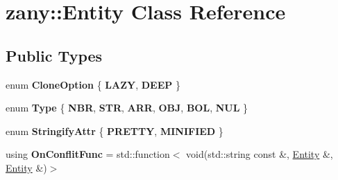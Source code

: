 \hypertarget{classzany_1_1_entity}{}\section{zany\+:\+:Entity Class Reference}
\label{classzany_1_1_entity}
\subsection*{Public Types}
\begin{DoxyCompactItemize}
\item 
\mbox{\label{classzany_1_1_entity_a5d33a8d8bda745a8c8e6cf0a03eee7e2}} 
enum {\bfseries Clone\+Option} \{ {\bfseries L\+A\+ZY}, 
{\bfseries D\+E\+EP}
 \}
\item 
\mbox{\label{classzany_1_1_entity_abac615101758cc03e160fc711e15c884}} 
enum {\bfseries Type} \{ \newline
{\bfseries N\+BR}, 
{\bfseries S\+TR}, 
{\bfseries A\+RR}, 
{\bfseries O\+BJ}, 
\newline
{\bfseries B\+OL}, 
{\bfseries N\+UL}
 \}
\item 
\mbox{\label{classzany_1_1_entity_a167c260d0fe1b1888bda92c0cfbf74f1}} 
enum {\bfseries Stringify\+Attr} \{ {\bfseries P\+R\+E\+T\+TY}, 
{\bfseries M\+I\+N\+I\+F\+I\+ED}
 \}
\item 
\mbox{\label{classzany_1_1_entity_a007686cc00c54a37865405a65d6f5477}} 
using {\bfseries On\+Conflit\+Func} = std\+::function$<$ void(std\+::string const \&, \hyperlink{classzany_1_1_entity}{Entity} \&, \hyperlink{classzany_1_1_entity}{Entity} \&)$>$
\end{DoxyCompactItemize}
